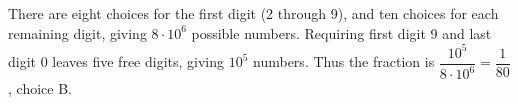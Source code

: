 There are eight choices for the first digit (2 through 9), and ten choices for each remaining digit, giving $8\cdot10^6$ possible numbers. Requiring first digit 9 and last digit 0 leaves five free digits, giving $10^5$ numbers. Thus the fraction is $\dfrac{10^5}{8\cdot10^6}=\boxed{\dfrac{1}{80}}$, choice B.
